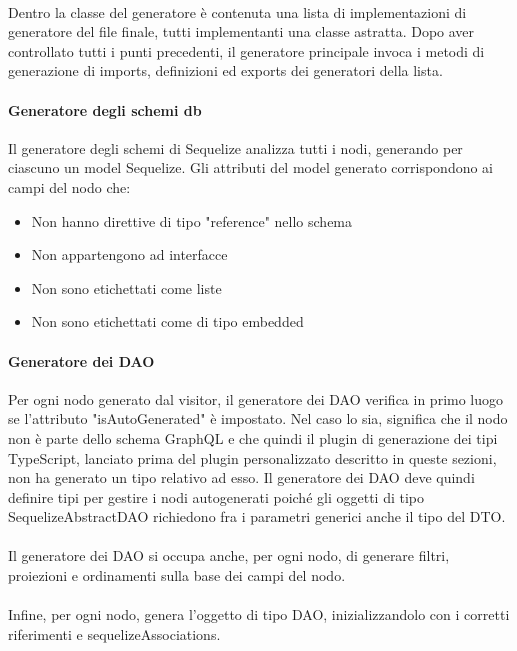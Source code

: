 \documentclass[a4paper, 12pt]{report}
\begin{document}
      \paragraph*{}
      Dentro la classe del generatore è contenuta una lista di implementazioni di generatore del file finale, tutti implementanti una classe astratta.
      Dopo aver controllato tutti i punti precedenti, il generatore principale invoca i metodi di generazione di imports, definizioni ed exports dei generatori della lista.
      \paragraph*{Generatore degli schemi db}
      Il generatore degli schemi di Sequelize analizza tutti i nodi, generando per ciascuno un model Sequelize.
      Gli attributi del model generato corrispondono ai campi del nodo che:
      \begin{itemize}
        \item Non hanno direttive di tipo "reference" nello schema
        \item Non appartengono ad interfacce
        \item Non sono etichettati come liste
        \item Non sono etichettati come di tipo embedded
      \end{itemize}
      \paragraph*{Generatore dei DAO}
      Per ogni nodo generato dal visitor, il generatore dei DAO verifica in primo luogo se l'attributo "isAutoGenerated" è impostato.
      Nel caso lo sia, significa che il nodo non è parte dello schema GraphQL e che quindi il plugin di generazione dei tipi TypeScript, lanciato prima del plugin personalizzato descritto in queste sezioni, non ha generato un tipo relativo ad esso.
      Il generatore dei DAO deve quindi definire tipi per gestire i nodi autogenerati poiché gli oggetti di tipo SequelizeAbstractDAO richiedono fra i parametri generici anche il tipo del DTO.
      \paragraph*{}
      Il generatore dei DAO si occupa anche, per ogni nodo, di generare filtri, proiezioni e ordinamenti sulla base dei campi del nodo.
      \paragraph*{}
      Infine, per ogni nodo, genera l'oggetto di tipo DAO, inizializzandolo con i corretti riferimenti e sequelizeAssociations.
\end{document}

